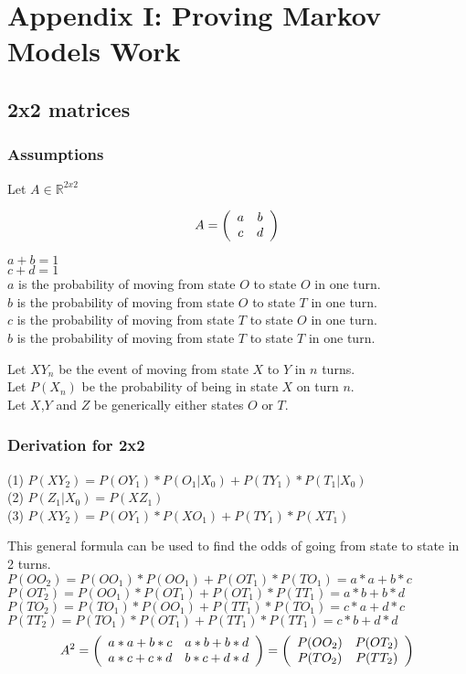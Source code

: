 \section{Appendix I: Proving Markov Models Work}
\subsection{2x2 matrices}
\subsubsection{Assumptions}
Let $A \in \mathbb{R}^{2x2}$

\[
A = 
\left( 
\begin{array}{c c}
a & b\\
c & d\\
\end{array}
\right) 
\]


$a+b=1$\\
$c+d=1$\\
$a$ is the probability of moving from state $O$ to state $O$ in one turn.\\
$b$ is the probability of moving from state $O$ to state $T$ in one turn.\\
$c$ is the probability of moving from state $T$ to state $O$ in one turn.\\
$b$ is the probability of moving from state $T$ to state $T$ in one turn.

Let $XY_n$ be the event of moving from state $X$ to $Y$ in $n$ turns. \\
Let $P(X_n)$ be the probability of being in state $X$ on turn $n$.\\
Let $X$,$Y$ and $Z$ be generically either states $O$ or $T$.

\subsubsection{Derivation for 2x2}

(1) $P(XY_2) = P(OY_1)*P(O_1|X_0)+P(TY_1)*P(T_1|X_0)$\\
(2) $P(Z_1|X_0) = P(XZ_1)$\\
(3) $P(XY_2) = P(OY_1)*P(XO_1)+P(TY_1)*P(XT_1)$

This general formula can be used to find the odds of going from state to state in 2 turns.\\
$P(OO_2) = P(OO_1)*P(OO_1)+P(OT_1)*P(TO_1) = a*a + b*c$\\
$P(OT_2) = P(OO_1)*P(OT_1)+P(OT_1)*P(TT_1) = a*b + b*d$\\
$P(TO_2) = P(TO_1)*P(OO_1)+P(TT_1)*P(TO_1) = c*a + d*c$\\
$P(TT_2) = P(TO_1)*P(OT_1)+P(TT_1)*P(TT_1) = c*b + d*d$
\[
A^2 = 
\left(
\begin{array}{c c}
a*a+b*c & a*b+b*d \\
a*c+c*d & b*c+d*d \\
\end{array}
\right)
=
\left(
\begin{array}{c c}
P(OO_2) & P(OT_2) \\
P(TO_2) & P(TT_2) \\
\end{array}
\right) \]

